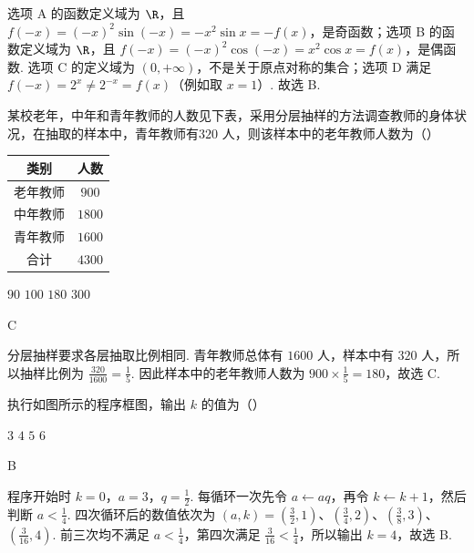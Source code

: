 \begin{solution}
选项 A 的函数定义域为 \(\R\)，且 \(f(-x)=(-x)^2\sin(-x)=-x^2\sin x=-f(x)\)，是奇函数；选项 B 的函数定义域为 \(\R\)，且 \(f(-x)=(-x)^2\cos(-x)=x^2\cos x=f(x)\)，是偶函数. 选项 C 的定义域为 \((0,+\infty)\)，不是关于原点对称的集合；选项 D 满足 \(f(-x)=2^x\ne 2^{-x}=f(x)\)（例如取 \(x=1\)）. 故选 B.
\end{solution}

\begin{problem}
某校老年，中年和青年教师的人数见下表，采用分层抽样的方法调查教师的身体状况，在抽取的样本中，青年教师有\(320\text{ 人}\)，则该样本中的老年教师人数为（\quad）

\begin{center}
\begin{tabular}{|c|c|}
\hline
类别 & 人数 \\
\hline
老年教师 & \(900\) \\
\hline
中年教师 & \(1800\) \\
\hline
青年教师 & \(1600\) \\
\hline
合计 & \(4300\) \\
\hline
\end{tabular}
\end{center}

\choices
    {\(90\)}
    {\(100\)}
    {\(180\)}
    {\(300\)}
\end{problem}

\begin{answer}
C
\end{answer}

\begin{solution}
分层抽样要求各层抽取比例相同. 青年教师总体有 \(1600\) 人，样本中有 \(320\) 人，所以抽样比例为 \(\frac{320}{1600}=\frac{1}{5}\). 因此样本中的老年教师人数为 \(900\times\frac15=180\)，故选 C.
\end{solution}

\begin{problem}
执行如图所示的程序框图，输出 \(k\) 的值为（\quad）


\choices
    {\(3\)}
    {\(4\)}
    {\(5\)}
    {\(6\)}
\end{problem}

\begin{answer}
B
\end{answer}

\begin{solution}
程序开始时 \(k=0\)，\(a=3\)，\(q=\frac12\). 每循环一次先令 \(a\leftarrow aq\)，再令 \(k\leftarrow k+1\)，然后判断 \(a<\frac14\). 四次循环后的数值依次为 \(\left(a,k\right)=\left(\frac32,1\right)\)、\(\left(\frac34,2\right)\)、\(\left(\frac38,3\right)\)、\(\left(\frac{3}{16},4\right)\). 前三次均不满足 \(a<\frac14\)，第四次满足 \(\frac{3}{16}<\frac14\)，所以输出 \(k=4\)，故选 B.
\end{solution}

